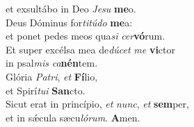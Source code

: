 \evenverse et exsultábo in Deo \textit{Je}\textit{su} \textbf{me}o.\\
\oddverse Deus Dóminus for\textit{ti}\textit{tú}\textit{do} \textbf{me}a:~\*\\
\oddverse et ponet pedes meos qua\textit{si} \textit{cer}\textbf{vó}rum.\\
\evenverse Et super excélsa mea de\textit{dú}\textit{cet} \textit{me} \textbf{vi}ctor~\*\\
\evenverse in psal\textit{mis} \textit{ca}\textbf{nén}tem.\\
\oddverse Glória \textit{Pa}\textit{tri}, \textit{et} \textbf{Fí}lio,~\*\\
\oddverse et Spirí\textit{tu}\textit{i} \textbf{San}cto.\\
\evenverse Sicut erat in princípio, \textit{et} \textit{nunc}, \textit{et} \textbf{sem}per,~\*\\
\evenverse et in sǽcula sæcu\textit{ló}\textit{rum}. \textbf{A}men.\\
